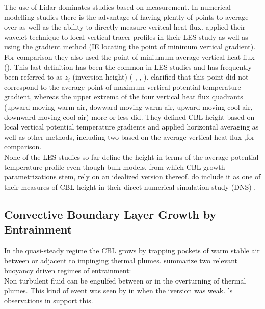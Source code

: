 The use of Lidar dominates studies based on measurement. In numerical modelling studies there
is the advantage of having plently of points to average over as well as the ability to directly
measure veritcal heat flux. \citeauthor{BrooksFowler2} \cite{BrooksFowler2}
applied their wavelet technique to local vertical tracer profiles in their \acs{LES} study as well as using the
gradient method (IE locating the point of minimum vertical gradient).  For comparison they also used the point of 
miniumum average vertical heat flux ().  This last definition has been the common
in \acs{LES} studies and has frequently been referred to as $z_{i}$ (inversion height) ( 
\cite{DearWill80}, \citeauthor{Sorbjan1} \cite{Sorbjan1}, \citeauthor{FedConzMir04} \cite{FedConzMir04}).
 \citeauthor{SullMoengStev} \cite{SullMoengStev} clarified that this point did not correspond to the
average point of maximum vertical potential temperature gradient, whereas the upper extrema of the four vertical
heat flux quadrants (upward moving warm air, dowward moving warm air, upward moving cool air, downward moving
cool air) more or less did. They defined \acs{CBL} height based on local vertical potential temperature gradients
and applied horizontal averaging as well as other methods, including two based on the average vertical heat flux
,for comparison.\\

None of the \acs{LES} studies so far define the height in terms of the average potential temperature profile
even though bulk models, from which \acs{CBL} growth parametrizations stem, rely on an idealized version thereof.
\citeauthor{GarciaMellado} do include it as one of their measures of \acs{CBL} height in their direct numerical
simulation study (\acs{DNS}) \cite{GarciaMellado}.       

\subsection{Convective Boundary Layer Growth by Entrainment}
\label{subsec:}

In the quasi-steady regime the \acs{CBL} grows by trapping pockets of warm stable air between
or adjacent to impinging thermal plumes.  \citeauthor{Traum11} \cite{Traum11} summarize two
relevant buoyancy driven regimes of entrainment:\\

Non turbulent fluid can be engulfed between or in the overturning of thermal plumes. This kind of
event was seen by  in \cite{SullMoengStev} when the iversion was weak. 
\citeauthor{Traum11}'s observations in \cite{Traum11} support this.\\


